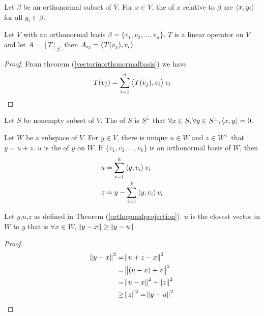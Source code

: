 \begin{definition}
    Let $\beta$ be an orthonormal subset of $V$. For $x \in V$, the  of $x$ relative to $\beta$ are $\left\langle \displaystyle x, y_i \right\rangle$ for all $y_i \in \beta$.
\end{definition}


\begin{theorem}
	Let $V$ with an orthonormal basis $\beta=\{v_1,v_2,\dots,v_n\}$. $T$ is a linear operator on $V$ and let $A=[T]_\beta$. then $A_{ij}=\left\langle \displaystyle T(v_j), v_i \right\rangle$.
\end{theorem}
\begin{proof}
	From theorem (\ref{vectorinorthonormalbasis}) we have
	\begin{equation*}
		T(v_j) = \sum_{i=1}^n \left\langle \displaystyle T(v_j), v_i \right\rangle v_i
	\end{equation*}
\end{proof}

\begin{definition}
    Let $S$ be nonempty subset of $V$. The  of $S$ is $S^\bot$ that $\forall x \in S, \forall y \in S^\bot, \left\langle \displaystyle x, y \right\rangle = 0$.
\end{definition}

\begin{theorem}
    Let $W$ be a subspace of $V$. For $y \in V$, there is unique $u \in W$ and $z \in W^\bot$ that $y = u + z$. $u$ is the  of $y$ on $W$. If $\{v_1, v_2, \dots, v_k \}$ is an orthonormal basis of $W$, then 
    \begin{equation}
        \begin{aligned}
            u &= \sum_{i=1}^k \left\langle \displaystyle y, v_i \right\rangle v_i \\
            z &= y -   \sum_{i=1}^k \left\langle \displaystyle y, v_i \right\rangle v_i          
        \end{aligned}
    \end{equation}
\end{theorem}

\begin{theorem}
    Let $y$,$u$,$z$ as defined in Theorem (\ref{orthogonalprojection}). $u$ is the closest vector in $W$ to $y$ that is $\forall x \in W$, $\norm{y-x} \geq \norm{y - u}$.
\end{theorem}
\begin{proof}
    \begin{equation*}
        \begin{aligned}
            \norm{y - x}^2 &= \norm{u + z - x}^2 \\
            &= \norm{(u - x) + z}^2 \\
            &= \norm{u - x}^2 + \norm{z}^2 \\
            &\geq \norm{z}^2 = \norm{y - u}^2
        \end{aligned}
    \end{equation*}
\end{proof}



